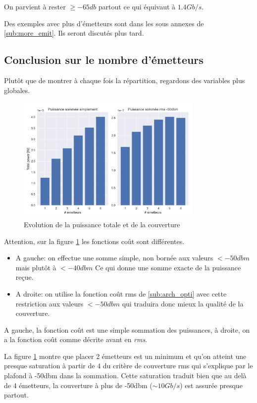 \documentclass[sn-mathphys-num]{sn-jnl}
\begin{document}
On parvient à rester $\ge -65db$ partout ce qui équivaut à $1.4 Gb/s$.

Des exemples avec plus d'émetteurs sont dans les sous annexes de \ref{sub:more_emit}.
Ils seront discutés plus tard.

\subsection{Conclusion sur le nombre d'émetteurs}
Plutôt que de montrer à chaque fois la répartition, regardons des variables
plus globales.

\begin{figure}[H]
    \centering
    \includegraphics[width=0.8\textwidth]{images/optimize/data_compare.png}
    \caption{Evolution de la puissance totale et de la couverture}
    \label{fig:datacomp}
\end{figure}

Attention, sur la figure \ref{fig:datacomp} les fonctions coût sont différentes. 
\begin{itemize}
    \item A gauche: on effectue une somme simple, non bornée aux valeurs $< -50dbm$ mais plutôt à $< -40dbm$
    Ce qui donne une somme exacte de la puissance reçue.
    
    \item A droite: on utilise la fonction coût rms de \ref{sub:arch_opti} avec cette restriction
    aux valeurs $< -50dbm$ qui traduira donc mieux la qualité de la couverture.
\end{itemize}

A gauche,
la fonction coût est une simple sommation des puissances, à droite,
on a la fonction coût comme décrite avant en \textit{rms}.


La figure \ref{fig:datacomp} montre que placer 2 émetteurs
est un minimum et qu'on atteint une presque saturation à partir de 4 du critère de couverture rms 
qui s'explique par le plafond à -50dbm dans la sommation.
Cette saturation traduit bien que au delà de 4 émetteurs, la couverture à plus de -50dbm ($\sim 10Gb/s$) est
assurée presque partout.
\end{document}
